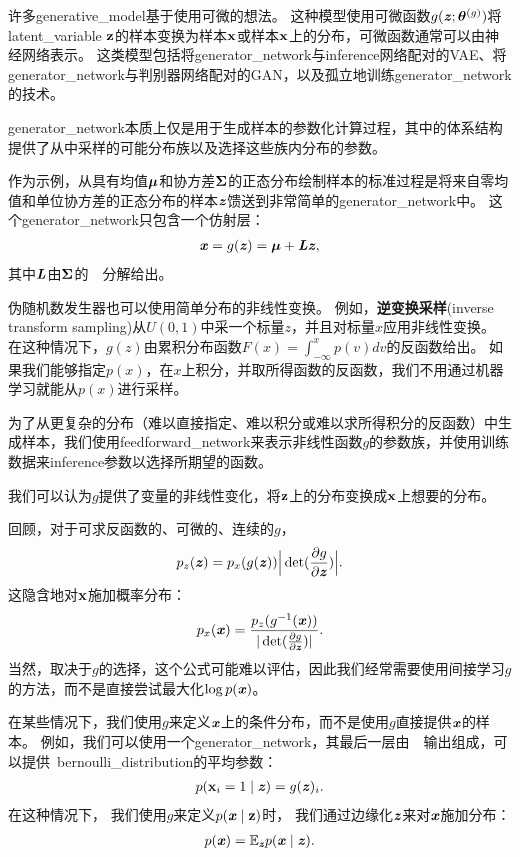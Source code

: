 许多\gls{generative_model}基于使用可微的想法。
这种模型使用可微函数$g(\boldsymbol{\mathit{z}};\boldsymbol{\theta}^{(g)})$将\gls{latent_variable} $\mathbf{z}$的样本变换为样本$\mathbf{x}$或样本$\mathbf{x}$上的分布，可微函数通常可以由神经网络表示。
这类模型包括将\gls{generator_network}与\gls{inference}网络配对的\gls{VAE}、将\gls{generator_network}与判别器网络配对的\gls{GAN}，以及孤立地训练\gls{generator_network}的技术。


\gls{generator_network}本质上仅是用于生成样本的参数化计算过程，其中的体系结构提供了从中采样的可能分布族以及选择这些族内分布的参数。

作为示例，从具有均值$\boldsymbol{\mu}$和协方差$\boldsymbol{\Sigma}$的正态分布绘制样本的标准过程是将来自零均值和单位协方差的正态分布的样本$\boldsymbol{\mathit{z}}$馈送到非常简单的\gls{generator_network}中。 这个\gls{generator_network}只包含一个仿射层：
\begin{align}
 \boldsymbol{\mathit{x}} = g(\boldsymbol{\mathit{z}}) = \boldsymbol{\mu} + \boldsymbol{\mathit{L}} \boldsymbol{\mathit{z}} ,
\end{align}
其中$\boldsymbol{\mathit{L}}$由$\boldsymbol{\Sigma}$的~~分解给出。


伪随机数发生器也可以使用简单分布的非线性变换。
例如，\textbf{逆变换采样}(inverse transform sampling)\citep{devroye2013non}从$U(0,1)$中采一个标量$z$，并且对标量$x$应用非线性变换。 %
在这种情况下，$g(z)$由累积分布函数$F(x) = \int_{-\infty}^{x} p(v) dv$的反函数给出。
如果我们能够指定$p(x)$，在$x$上积分，并取所得函数的反函数，我们不用通过机器学习就能从$p(x)$进行采样。

为了从更复杂的分布（难以直接指定、难以积分或难以求所得积分的反函数）中生成样本，我们使用\gls{feedforward_network}来表示非线性函数$g$的参数族，并使用训练数据来\gls{inference}参数以选择所期望的函数。

我们可以认为$g$提供了变量的非线性变化，将$\mathbf{z}$上的分布变换成$\mathbf{x}$上想要的分布。

回顾，对于可求反函数的、可微的、连续的$g$，
\begin{align}
 p_z(\boldsymbol{\mathit{z}}) = p_x(g(\boldsymbol{\mathit{z}})) \Big | \det (\frac{\partial g}{\partial \boldsymbol{\mathit{z}}}) \Big |.
\end{align}
这隐含地对$\mathbf{x}$施加概率分布：
\begin{align}
 p_x(\boldsymbol{\mathit{x}}) = \frac{p_z(g^{-1}(\boldsymbol{\mathit{x}}))}{ | \det (\frac{\partial g}{\partial \boldsymbol{\mathit{z}}}) |}.
\end{align}
当然，取决于$g$的选择，这个公式可能难以评估，因此我们经常需要使用间接学习$g$的方法，而不是直接尝试最大化$\log p(\boldsymbol{\mathit{x}})$。

在某些情况下，我们使用$g$来定义$\boldsymbol{\mathit{x}}$上的条件分布，而不是使用$g$直接提供$\boldsymbol{\mathit{x}}$的样本。
例如，我们可以使用一个\gls{generator_network}，其最后一层由~~输出组成，可以提供~\gls{bernoulli_distribution}的平均参数：
\begin{align}
 p(\mathbf{x}_i = 1  \mid  \boldsymbol{\mathit{z}}) = g(\boldsymbol{\mathit{z}})_i .
\end{align}
在这种情况下， 我们使用$g$来定义$p(\boldsymbol{\mathit{x}}  \mid  \mathbf{z})$时， 我们通过边缘化$\boldsymbol{\mathit{z}}$来对$\boldsymbol{\mathit{x}}$施加分布：
\begin{align}
 p(\boldsymbol{\mathit{x}}) = \mathbb{E}_{\boldsymbol{\mathit{z}}} p(\boldsymbol{\mathit{x}}  \mid  \boldsymbol{\mathit{z}}).
\end{align}

